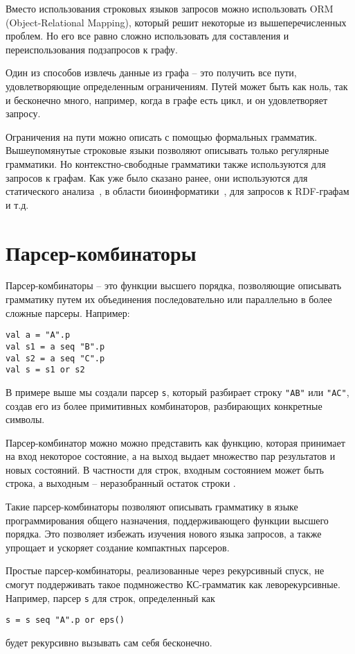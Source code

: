 Вместо использования строковых языков запросов можно использовать ORM (Object-Relational Mapping), который решит некоторые из вышеперечисленных проблем. Но его все равно сложно использовать для составления и переиспользования подзапросов к графу.

Один из способов извлечь данные из графа -- это получить все пути, удовлетворяющие определенным ограничениям.
Путей может быть как ноль, так и бесконечно много, например, когда в графе есть цикл, и он удовлетворяет запросу.

Ограничения на пути можно описать с помощью формальных грамматик. Вышеупомянутые строковые языки позволяют описывать только регулярные грамматики. Но контекстно-свободные грамматики также используются для запросов к графам. Как уже было сказано ранее, они используются для статического анализа~\cite{RepsProgramAnalysis}, в области биоинформатики~\cite{BioinformaticsCF}, для запросов к RDF-графам \cite{RDF_CF} и т.д.


\section{Парсер-комбинаторы}

Парсер-комбинаторы -- это функции высшего порядка, позволяющие описывать грамматику путем их объединения последовательно или параллельно в более сложные парсеры. Например:
\begin{lstlisting}
val a = "A".p
val s1 = a seq "B".p
val s2 = a seq "C".p
val s = s1 or s2
\end{lstlisting}
В примере выше мы создали парсер \verb|s|, который разбирает строку \verb|"AB"| или \verb|"AС"|, создав его из более примитивных комбинаторов, разбирающих конкретные символы.

Парсер-комбинатор можно можно представить как функцию, которая принимает на вход некоторое состояние, а на выход выдает множество пар результатов и новых состояний. В частности для строк, входным состоянием может быть строка, а выходным -- неразобранный остаток строки \cite{Hutton_1992}.

Такие парсер-комбинаторы позволяют описывать грамматику в языке программирования общего назначения, поддерживающего функции высшего порядка. Это позволяет избежать изучения нового языка запросов, а также упрощает и ускоряет создание компактных парсеров.

Простые парсер-комбинаторы, реализованные через рекурсивный спуск, не смогут поддерживать такое подмножество КС-грамматик как леворекурсивные.
Например, парсер \verb|s| для строк, определенный как
\begin{lstlisting}[numbers=none, frame=none, xleftmargin=0pt]
s = s seq "A".p or eps()
\end{lstlisting}
будет рекурсивно вызывать сам себя бесконечно.

